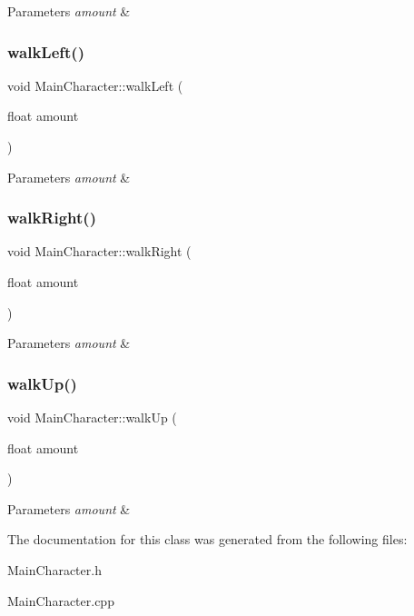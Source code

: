 \begin{DoxyParams}{Parameters}
{\em amount} & \\
\hline
\end{DoxyParams}
\mbox{\label{classMainCharacter_a469893887080b1ae57fd0efa260d1434}} 
\subsubsection{\texorpdfstring{walkLeft()}{walkLeft()}}
{\footnotesize\ttfamily void Main\+Character\+::walk\+Left (\begin{DoxyParamCaption}\item[{float}]{amount }\end{DoxyParamCaption})}


\begin{DoxyParams}{Parameters}
{\em amount} & \\
\hline
\end{DoxyParams}
\mbox{\label{classMainCharacter_abe834fc327cbaa6192563729df589297}} 
\subsubsection{\texorpdfstring{walkRight()}{walkRight()}}
{\footnotesize\ttfamily void Main\+Character\+::walk\+Right (\begin{DoxyParamCaption}\item[{float}]{amount }\end{DoxyParamCaption})}


\begin{DoxyParams}{Parameters}
{\em amount} & \\
\hline
\end{DoxyParams}
\mbox{\label{classMainCharacter_a23348476f59cb79981311cac30266ed5}} 
\subsubsection{\texorpdfstring{walkUp()}{walkUp()}}
{\footnotesize\ttfamily void Main\+Character\+::walk\+Up (\begin{DoxyParamCaption}\item[{float}]{amount }\end{DoxyParamCaption})}


\begin{DoxyParams}{Parameters}
{\em amount} & \\
\hline
\end{DoxyParams}


The documentation for this class was generated from the following files\+:\begin{DoxyCompactItemize}
\item 
Main\+Character.\+h\item 
Main\+Character.\+cpp\end{DoxyCompactItemize}
